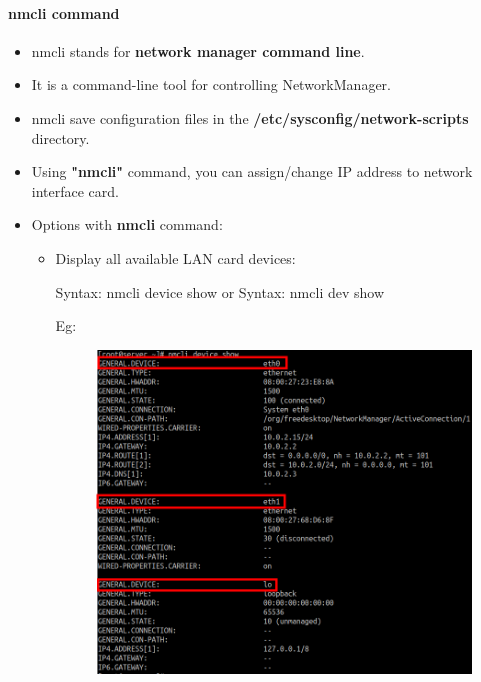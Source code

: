 \setlength{\columnsep}{3pt}
\begin{flushleft}
\bigskip

\paragraph{nmcli command}

\begin{itemize}
	\item nmcli stands for \textbf{network manager command line}.
	\item It is a command-line tool for controlling NetworkManager.
	\item nmcli save configuration files in the \textbf{/etc/sysconfig/network-scripts} directory.
	\item Using \textbf{"nmcli"} command, you can assign/change IP address to network interface card.
	\item Options with \textbf{nmcli} command:
	\begin{itemize}
		\item Display all available LAN card devices:
		\begin{tcolorbox}[breakable,notitle,boxrule=-0pt,colback=pink,colframe=pink]
			\color{black}
			\font=9pt
			Syntax: nmcli device show
			\newline
			or
			\newline
			Syntax: nmcli dev show
			\font=4pt
		\end{tcolorbox}
		Eg:
		\begin{figure}[h!]
			\centering
			\includegraphics[scale=.35]{content/chapter14/images/cards.png}

\end{figure}
\end{itemize}
\end{itemize}
\end{flushleft}
